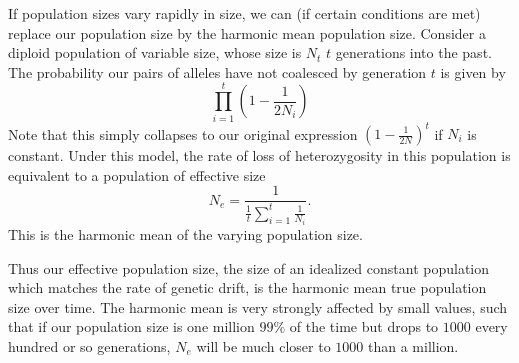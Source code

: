 If population sizes vary rapidly in size, we can (if certain conditions are met) replace our population size by the harmonic mean population size.
Consider a diploid population of variable size, whose size is $N_t$ $t$ generations into the
past. The probability our pairs of alleles have not coalesced by generation $t$ is
given by
\begin{equation}
\prod_{i=1}^{t} \left(1-\frac{1}{2N_i} \right) \label{eqn:var_pop_coal}
\end{equation}
Note that this simply collapses to our original expression
$\left(1-\frac{1}{2N } \right)^t $ if $N_i$ is constant. Under this model, the rate of loss of heterozygosity in this population is equivalent to
a population of effective size
\begin{equation}
N_e =\frac{1}{\frac{1}{t} \sum_{i=1}^{t} \frac{1}{N_i} }. \label{eq:Ne_harmonic}
\end{equation}
This is the harmonic mean of the varying population size. 


Thus our effective population size, the size of an idealized constant
population which matches the rate of genetic drift, is the harmonic
mean true population size over time. The harmonic mean is very
strongly affected by small values, such that if our population size is
one million $99\%$ of the time but drops to $1000$ every hundred or
so generations, $N_e$ will be much closer to $1000$ than a
million. \\


